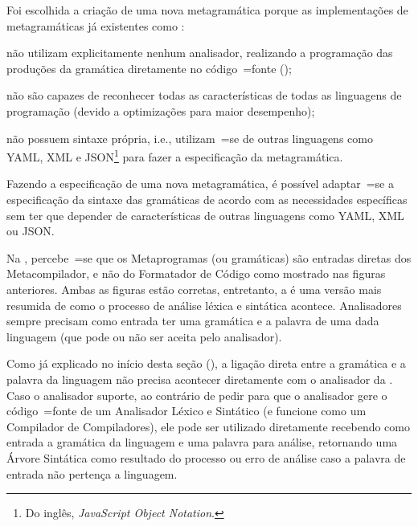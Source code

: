 Foi escolhida a criação de uma nova metagramática porque as implementações de metagramáticas já existentes como :
\begin{inparaenum}[1)]
\item não utilizam explicitamente nenhum analisador,
realizando a programação das produções da gramática diretamente no código~=fonte ();
\item não são capazes de reconhecer todas as características de todas as linguagens de programação (devido a optimizações para maior desempenho);
\item não possuem sintaxe própria,
i.e.,
utilizam~=se de outras linguagens como YAML,
XML e JSON\footnote{%
Do inglês,
\textit{JavaScript Object Notation}.
} \cite{foundationsOfJSONSchema} para fazer a especificação da metagramática.
\end{inparaenum}%
Fazendo a especificação de uma nova metagramática,
é possível adaptar~=se a especificação da sintaxe das gramáticas de acordo com as necessidades específicas sem ter que depender de características de outras linguagens como YAML,
XML ou
JSON.

Na ,
percebe~=se que os Metaprogramas (ou gramáticas) são entradas diretas dos Metacompilador,
e não do Formatador de Código como mostrado nas figuras anteriores.
Ambas as figuras estão corretas,
entretanto,
a  é uma versão mais resumida de como o processo de análise léxica e
sintática acontece.
Analisadores sempre precisam como entrada ter uma gramática e
a palavra de uma dada linguagem (que pode ou
não ser aceita pelo analisador).

Como já explicado no início desta seção (),
a ligação direta entre a gramática e
a palavra da linguagem não precisa acontecer diretamente com o analisador da .
Caso o analisador suporte,
ao contrário de pedir para que o analisador gere o código~=fonte de um Analisador Léxico e
Sintático (e funcione como um Compilador de Compiladores),
ele pode ser utilizado diretamente recebendo como entrada a gramática da linguagem e
uma palavra para análise,
retornando uma Árvore Sintática como resultado do processo ou
erro de análise caso a palavra de entrada não pertença a linguagem.

